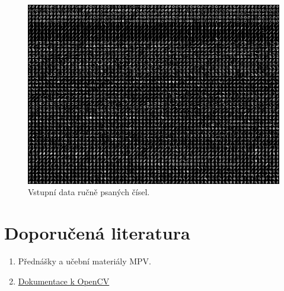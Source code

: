 \documentclass[12pt, a4paper]{article}
\begin{document}
\pagebreak

\begin{figure}[ht!]
	\centering
	\includegraphics[width=\textwidth]{Train.png}
	\caption{Vstupní data ručně psaných čísel.}
	\label{fig:Train}
\end{figure}			


\section*{Doporučená literatura}
\begin{enumerate}
	\item Přednášky a učební materiály MPV.
	\item \href{http://docs.opencv.org/}{Dokumentace k OpenCV}
\end{enumerate}
\end{document}
